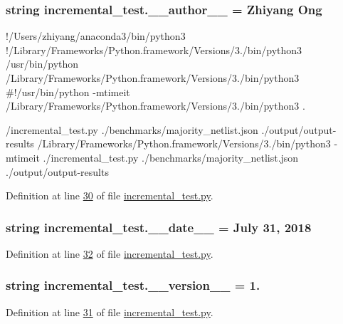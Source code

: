 \subsubsection[{\+\_\+\+\_\+author\+\_\+\+\_\+}]{\setlength{\rightskip}{0pt plus 5cm}string incremental\+\_\+test.\+\_\+\+\_\+author\+\_\+\+\_\+ = \textquotesingle{}Zhiyang Ong\textquotesingle{}}\label{namespaceincremental__test_a5f6427d0e520c9febabce9161afb249b}


!/\+Users/zhiyang/anaconda3/bin/python3 !/\+Library/\+Frameworks/\+Python.framework/\+Versions/3./bin/python3 /usr/bin/python /\+Library/\+Frameworks/\+Python.framework/\+Versions/3./bin/python3 \#!/usr/bin/python -\/mtimeit /\+Library/\+Frameworks/\+Python.framework/\+Versions/3./bin/python3 . 

/incremental\+\_\+test.py ./benchmarks/majority\+\_\+netlist.json ./output/output-\/results /\+Library/\+Frameworks/\+Python.framework/\+Versions/3./bin/python3 -\/mtimeit ./incremental\+\_\+test.py ./benchmarks/majority\+\_\+netlist.json ./output/output-\/results 

Definition at line \hyperlink{incremental__test_8py_source_l00030}{30} of file \hyperlink{incremental__test_8py_source}{incremental\+\_\+test.\+py}.

\hypertarget{namespaceincremental__test_afce713750b4dd215527495dfc84d047e}{}
\subsubsection[{\+\_\+\+\_\+date\+\_\+\+\_\+}]{\setlength{\rightskip}{0pt plus 5cm}string incremental\+\_\+test.\+\_\+\+\_\+date\+\_\+\+\_\+ = \textquotesingle{}July 31, 2018\textquotesingle{}}\label{namespaceincremental__test_afce713750b4dd215527495dfc84d047e}


Definition at line \hyperlink{incremental__test_8py_source_l00032}{32} of file \hyperlink{incremental__test_8py_source}{incremental\+\_\+test.\+py}.

\hypertarget{namespaceincremental__test_a0f94dd1f320b9558e27a5809d2041c4c}{}
\subsubsection[{\+\_\+\+\_\+version\+\_\+\+\_\+}]{\setlength{\rightskip}{0pt plus 5cm}string incremental\+\_\+test.\+\_\+\+\_\+version\+\_\+\+\_\+ = \textquotesingle{}1.\textquotesingle{}}\label{namespaceincremental__test_a0f94dd1f320b9558e27a5809d2041c4c}


Definition at line \hyperlink{incremental__test_8py_source_l00031}{31} of file \hyperlink{incremental__test_8py_source}{incremental\+\_\+test.\+py}.

